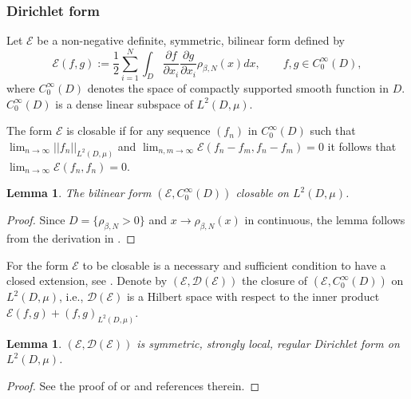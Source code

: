 \documentclass[11pt]{article}
\numberwithin{equation}{section}
\newtheorem{lemma}[theorem]{Lemma}
\theoremstyle{definition}
\begin{document}
\subsubsection*{Dirichlet form}
Let $\mathcal{E}$ be a non-negative definite, symmetric, bilinear form defined by 
\[
    \mathcal{E}(f,g):=\frac{1}{2}\sum\limits_{i=1}^{N}\int_{D}\frac{\partial f}{\partial x_{i}}\frac{\partial g}{\partial x_{i}} \rho_{\beta,N}(x)dx,\qquad f,g\in C^{\infty}_{0}(D),
\]
where $C^{\infty}_{0}(D)$ denotes the space of compactly supported smooth function in $D$. $C^{\infty}_{0}(D)$ is a dense linear subspace of $L^{2}(D,\mu)$. 

The form $\mathcal{E}$ is closable if for any sequence  $(f_{n})$ in $ C^{\infty}_{0}(D)$ such that $\lim_{n\to\infty}||f_{n}||_{L^{2}(D,\mu)}$ and $\lim_{n,m\to\infty}\mathcal{E}(f_{n}-f_{m}, f_{n}-f_{m})=0$ it follows that $\lim_{n\to\infty}\mathcal{E}(f_{n},f_{n})=0$.
\begin{lemma}
    The bilinear form $(\mathcal{E}, C^{\infty}_{0}(D))$ closable on $L^{2}(D,\mu)$.
\end{lemma}
\begin{proof}
    Since $D= \{\rho_{\beta,N}>0\}$ and $x\to \rho_{\beta,N}(x)$ in continuous, the lemma follows from the derivation in \cite[Section II.2.a]{ma1992introduction}.
\end{proof}

For the form $\mathcal{E}$ to be closable is a necessary and sufficient condition to have a closed extension, see \cite[Chapter]{fukushima2011dirichlet}. Denote by $(\mathcal{E}, \mathcal{D}(\mathcal{E}))$ the closure of $(\mathcal{E}, C^{\infty}_{0}(D))$ on $L^{2}(D,\mu)$, i.e., $\mathcal{D}(\mathcal{E})$ is a Hilbert space with respect to the inner product $\mathcal{E}(f,g) + (f,g)_{L^{2}(D,\mu)}$.
\begin{lemma}
    $(\mathcal{E}, \mathcal{D}(\mathcal{E}))$ is symmetric, strongly local, regular Dirichlet form on $L^{2}(D,\mu)$.
\end{lemma}
\begin{proof}
    See the proof of \cite[Theorem 4.1.4]{baur2014elliptic} or
    \cite[Proposition 4.2]{baur2013construction} and references therein.
\end{proof}
\end{document}
